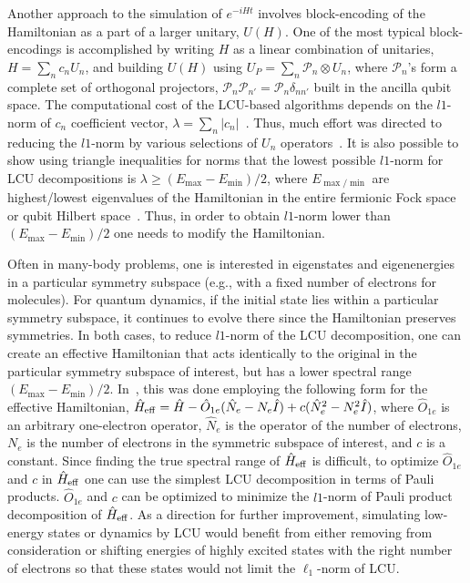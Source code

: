 Another approach to the simulation of $e^{-iHt}$ involves block-encoding of the Hamiltonian as a part of a larger unitary, $U(H)$. One of the most typical block-encodings is accomplished by writing $H$ as a linear combination of unitaries, $H = \sum_n c_n U_n$, and building $U(H)$ using $U_P = \sum_n \mathcal{P}_n\otimes U_n$, where $\mathcal{P}_n$'s form a complete set of orthogonal projectors, $\mathcal{P}_n\mathcal{P}_{n'} = \mathcal{P}_n \delta_{nn'}$ built in the ancilla qubit space.
The computational cost of the LCU-based algorithms depends on the $l1$-norm of $c_n$ coefficient vector, $\lambda = \sum_{n} |c_n|$~\cite{LCU_childs}.
Thus, much effort was directed to reducing the $l1$-norm by various selections of $U_n$ operators~\cite{PRXQuantum.2.030305,loaiza2023LCU1,loaiza2023LCU2,loaiza2023LCU3}.
It is also possible to show using triangle inequalities for norms that the lowest possible $l1$-norm for LCU decompositions is $\lambda\ge (E_{\max}-E_{\min})/2$, where $E_{\max/\min}$ are highest/lowest eigenvalues of the Hamiltonian in the entire 
fermionic Fock space or qubit Hilbert space~\cite{loaiza2023LCU1}.
Thus, in order to obtain $l1$-norm lower than $(E_{\max}-E_{\min})/2$ one needs to modify the Hamiltonian.

Often in many-body problems, one is interested in eigenstates and eigenenergies in a particular symmetry subspace (e.g., with a fixed number of electrons for molecules). For quantum dynamics, if the initial state lies within a particular symmetry subspace, it continues to evolve there since the Hamiltonian preserves symmetries. In both cases, to reduce $l1$-norm of the LCU decomposition, one can create an effective Hamiltonian that acts identically to the original in the particular symmetry subspace of interest, but has a lower spectral range $(E_{\max}-E_{\min})/2$. In~, this was done employing the following form for the effective Hamiltonian, $\hat H_{\rm eff} = \hat H - \hat O_{1e}(\hat N_e - N_e\hat I) + c(\hat N_e^2 - N_e^2\hat I)$, where $\hat O_{1e}$ is an arbitrary one-electron operator, $\hat N_e$ is the operator of the number of electrons, $N_e$ is the number of electrons in the symmetric subspace of interest, and $c$ is a constant. Since finding the true spectral range of $\hat H_{\rm eff}$ is difficult, to optimize $\hat O_{1e}$ and $c$ in $\hat H_{\rm eff}$ one can use the simplest LCU decomposition in terms of Pauli products. $\hat O_{1e}$ and $c$ can be optimized to minimize the $l1$-norm of Pauli product decomposition of $\hat H_{\rm eff}$.\cite{loaiza2023LCU2} 
As a direction for further improvement, simulating low-energy states or dynamics by LCU would benefit from either removing from consideration or shifting energies of highly excited states with the right number of electrons so that these states would not limit the $\ell_1$-norm of LCU. 

